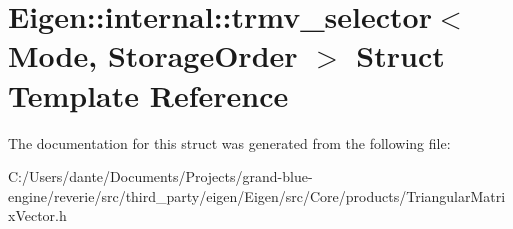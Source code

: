 \hypertarget{struct_eigen_1_1internal_1_1trmv__selector}{}\section{Eigen\+::internal\+::trmv\+\_\+selector$<$ Mode, Storage\+Order $>$ Struct Template Reference}
\label{struct_eigen_1_1internal_1_1trmv__selector}


The documentation for this struct was generated from the following file\+:\begin{DoxyCompactItemize}
\item 
C\+:/\+Users/dante/\+Documents/\+Projects/grand-\/blue-\/engine/reverie/src/third\+\_\+party/eigen/\+Eigen/src/\+Core/products/Triangular\+Matrix\+Vector.\+h\end{DoxyCompactItemize}
